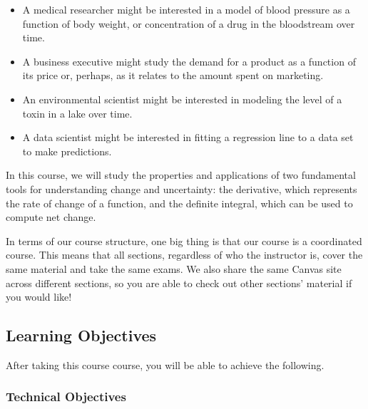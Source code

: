 \documentclass[12pt]{article}
\begin{document}
        \begin{itemize}
            \item A medical researcher might be interested in a model of blood pressure as a function of body weight, or concentration of a drug in the bloodstream over time.
            \item A business executive might study the demand for a product as a function of its price or, perhaps, as it relates to the amount spent on marketing.
            \item An environmental scientist might be interested in modeling the level of a toxin in a lake over time.
            \item A data scientist might be interested in fitting a regression line to a data set to make predictions.
        \end{itemize}

        In this course, we will study the properties and applications of two fundamental tools for understanding change and uncertainty: the derivative, which represents the rate of change of a function, and the definite integral, which can be used to compute net change. %

        In terms of our course structure, one big thing is that our course is a coordinated course. This means that all sections, regardless of who the instructor is, cover the same material and take the same exams. We also share the same Canvas site across different sections, so you are able to check out other sections' material if you would like! %

        \subsection{Learning Objectives}


        After taking this course course, you will be able to achieve the following.
    
        \subsubsection{Technical Objectives}
\end{document}
